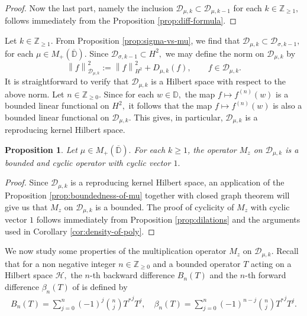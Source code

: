 \documentclass[10pt,oneside,reqno]{amsart}
\newtheorem{proposition}[theorem]{Proposition}
\theoremstyle{definition}
\theoremstyle{remark}
\newcommand{\norm}[1]{\left\lVert #1 \right\rVert}
\renewcommand{\ge}{\geqslant}
\newcommand{\D}{\mathbb D}
\numberwithin{equation}{section}
\begin{document}
\begin{proof}
Now the last part, namely the inclusion $\mathscr D_{\mu,k}\subset \mathscr D_{\mu,k-1}$ for each $k\in \mathbb Z_{\geqslant 1},$ follows immediately from the Proposition \ref{prop:diff-formula}.
\end{proof}

Let $k\in \mathbb Z_{\geqslant 1}.$ From Proposition \ref{prop:sigma-vs-mu},  we find that $ \mathscr D_{\mu, k} \subset \mathscr D_{\sigma, k-1},$ for each $\mu\in M_+(\overline{\D}).$ Since $\mathscr D_{\sigma,k-1}\subset H^2,$ we may define the norm on $\mathscr D_{\mu, k}$ by 
\begin{equation*}
    \norm{f}_{\mathscr D_{\mu, k}} ^2 := \norm{f}_{H^2} ^2 + D_{\mu, k} (f), \qquad f \in \mathscr D_{\mu, k}.
\end{equation*}
It is straightforward to verify that $\mathscr D_{\mu,k}$ is a Hilbert space with respect to the above norm. Let $n\in\mathbb Z_{\geqslant 0}.$ Since for each $w\in \D,$ the map $f\mapsto f^{(n)}(w)$ is a bounded linear functional on $H^2,$ it follows that the map $f\mapsto f^{(n)}(w)$ is also a bounded linear functional on $\mathscr D_{\mu,k}.$ This gives, in particular,  $\mathscr D_{\mu,k}$ is a reproducing kernel Hilbert space.
    
\begin{proposition}
       Let $\mu\in M_+(\overline{\D}).$ For each $k \ge 1$, the operator $M_z$ on $\mathscr D_{\mu, k} $ is a bounded and cyclic operator with cyclic vector $1.$ 
    \end{proposition}
    \begin{proof}
        Since $\mathscr D _{\mu, k}$ is a reproducing kernel Hilbert space, an application of the Proposition \ref{prop:boundedness-of-mu} together with closed graph theorem  will give us that $M_z$ on $\mathscr D_{\mu, k} $ is a bounded.
The proof of cyclicity of $M_z$ with cyclic vector $1$ follows immediately from Proposition \ref{prop:dilations} and the arguments used in Corollary \ref{cor:density-of-poly}.
    \end{proof}

We now study some properties of the multiplication operator $M_z$ on $\mathscr D_{\mu,k}.$ Recall that for a non negative integer $n\in \mathbb Z_{\geqslant 0}$ and a bounded operator $T$ acting on a Hilbert space $\mathcal H,$  the $n$-th backward difference $B_n(T)$ and the $n$-th forward difference $\beta_n(T)$ of is defined by
\begin{align*}
    B_n(T)= \sum\limits_{j=0}^n (-1)^j\binom{n}{j}{T^*}^j T^j,\quad  \beta_n(T)= \sum\limits_{j=0}^n (-1)^{n-j}\binom{n}{j}{T^*}^j T^j.
\end{align*} 
\end{document}
